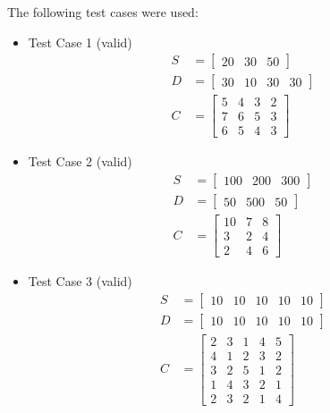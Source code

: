 \documentclass{article}
\begin{document}
The following test cases were used:

\begin{itemize}
    \item Test Case 1 (valid)
          \begin{align*}
              S & = \begin{bmatrix} 20 & 30 & 50 \end{bmatrix}      \\
              D & = \begin{bmatrix} 30 & 10 & 30 & 30 \end{bmatrix} \\
              C & = \begin{bmatrix}
                        5 & 4 & 3 & 2 \\
                        7 & 6 & 5 & 3 \\
                        6 & 5 & 4 & 3
                    \end{bmatrix}
          \end{align*}

    \item Test Case 2 (valid)
          \begin{align*}
              S & = \begin{bmatrix} 100 & 200 & 300 \end{bmatrix} \\
              D & = \begin{bmatrix} 50 & 500 & 50 \end{bmatrix}   \\
              C & = \begin{bmatrix}
                        10 & 7 & 8 \\
                        3  & 2 & 4 \\
                        2  & 4 & 6
                    \end{bmatrix}
          \end{align*}

    \item Test Case 3 (valid)
          \begin{align*}
              S & = \begin{bmatrix} 10 & 10 & 10 & 10 & 10 \end{bmatrix} \\
              D & = \begin{bmatrix} 10 & 10 & 10 & 10 & 10 \end{bmatrix} \\
              C & = \begin{bmatrix}
                        2 & 3 & 1 & 4 & 5 \\
                        4 & 1 & 2 & 3 & 2 \\
                        3 & 2 & 5 & 1 & 2 \\
                        1 & 4 & 3 & 2 & 1 \\
                        2 & 3 & 2 & 1 & 4
                    \end{bmatrix}
          \end{align*}


\end{itemize}
\end{document}
